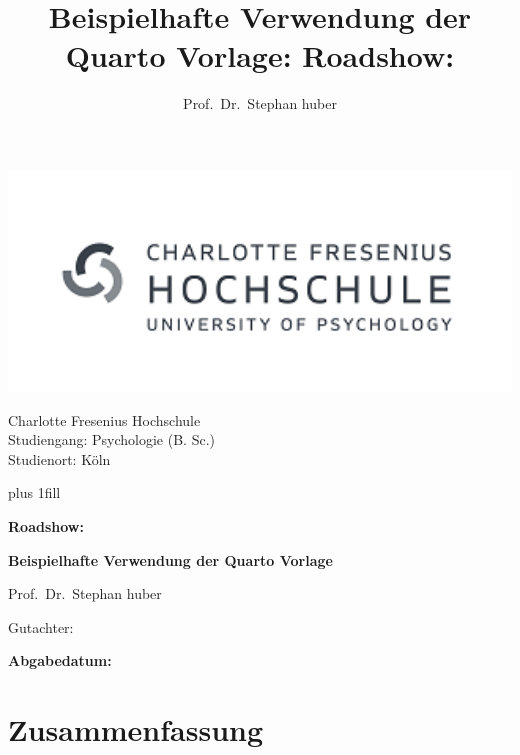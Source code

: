 \documentclass[
  stu,
  floatsintext,
  longtable,
  a4paper,
  nolmodern,
  notxfonts,
  notimes,
  donotrepeattitle,
  colorlinks=true,linkcolor=blue,citecolor=blue,urlcolor=blue]{apa7}
\title{Beispielhafte Verwendung der Quarto Vorlage: Roadshow:}
\author{Prof.~Dr.~Stephan huber}
\affiliation{
{Köln, NRW }}
\begin{document}
    \cleardoublepage
\thispagestyle{empty}
\hfill \includegraphics[width=20cm]{logo.png}\\
{\centering
  {\large Charlotte Fresenius Hochschule\\
Studiengang: Psychologie (B. Sc.)\\
 Studienort: Köln  \par
}
  \hbox{}\vskip 0cm plus 1fill
  {\Large \bfseries Roadshow: \par}
      \vspace{3ex}
  {\Large \bfseries Beispielhafte Verwendung der Quarto
Vorlage \\  \par}
      \vfill
      {\large Prof.~Dr.~Stephan huber \par}
      \vspace{0ex}
  { \par}
  \vspace{0ex}
    {\large  \par}
  \vspace{0ex}
  { \par}
    \vspace{0ex}
    {\large  \par}
  \vspace{0ex}
  { \par}
  \vspace{12ex}
  {\large Gutachter:  \par}
  \vfill
  {\bfseries\large Abgabedatum:  \par}
  \vspace{2ex}
  \clearpage
}




\setcounter{secnumdepth}{5}

\setlength\LTleft{0pt}


\section*{Zusammenfassung}\label{zusammenfassung}
\end{document}
